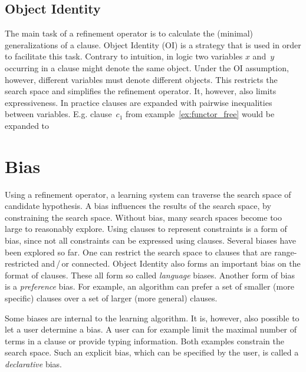 \subsection{Object Identity}
The main task of a refinement operator is to calculate the (minimal) generalizations of a clause. Object Identity (OI) is a strategy that is used in order to facilitate this task. Contrary to intuition, in logic two variables $x$ and~$y$ occurring in a clause might denote the same object. Under the OI assumption, however, different variables must denote different objects. This restricts the search space and simplifies the refinement operator. It, however, also limits expressiveness. In practice clauses are expanded with pairwise inequalities between variables. E.g. clause~$c_1$ from example~\ref{ex:functor_free} would be expanded to 

\section{Bias}
Using a refinement operator, a learning system can traverse the search space of candidate hypothesis. A bias influences the results of the search space, by constraining the search space. Without bias, many search spaces become too large to reasonably explore. Using clauses to represent constraints is a form of bias, since not all constraints can be expressed using clauses. Several biases have been explored so far. One can restrict the search space to clauses that are range-restricted and\,/\,or connected. Object Identity also forms an important bias on the format of clauses. These all form so called \textit{language} biases. Another form of bias is a \textit{preference} bias. For example, an algorithm can prefer a set of smaller (more specific) clauses over a set of larger (more general) clauses.

Some biases are internal to the learning algorithm. It is, however, also possible to let a user determine a bias. A user can for example limit the maximal number of terms in a clause or provide typing information. Both examples constrain the search space. Such an explicit bias, which can be specified by the user, is called a \textit{declarative} bias.